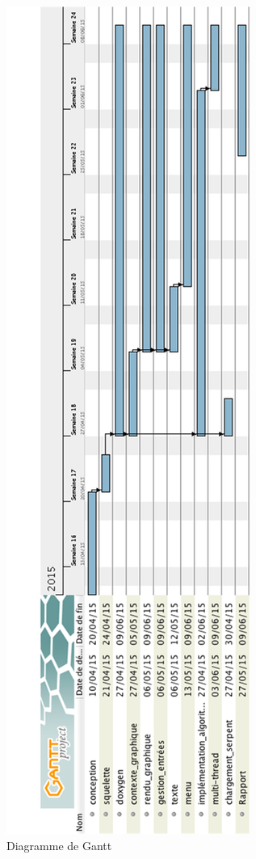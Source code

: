 \begin{figure}[h]
 \centering
 \includegraphics[scale=0.5,keepaspectratio=true]{img/gantt.png}
 \caption{Diagramme de Gantt}
 \label{Gantt}
\end{figure}
